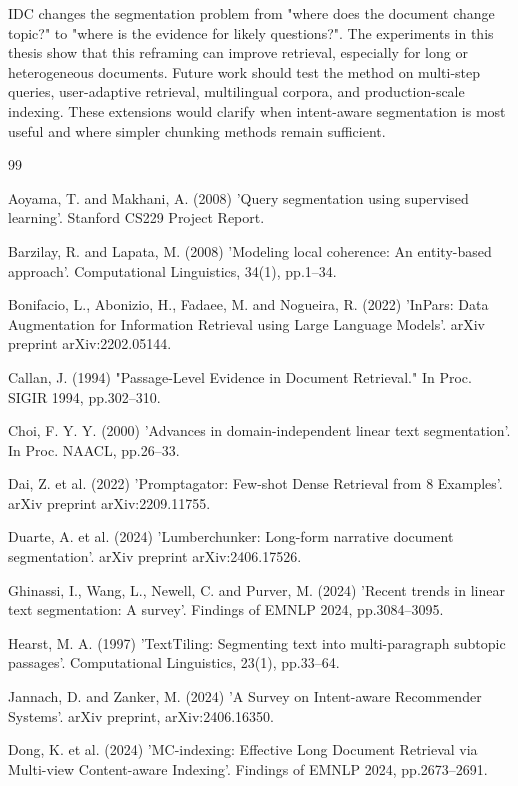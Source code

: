 \documentclass[12pt,a4paper]{report}
\begin{document}
IDC changes the segmentation problem from "where does the document change topic?" to "where is the evidence for likely questions?". The experiments in this thesis show that this reframing can improve retrieval, especially for long or heterogeneous documents. Future work should test the method on multi-step queries, user-adaptive retrieval, multilingual corpora, and production-scale indexing. These extensions would clarify when intent-aware segmentation is most useful and where simpler chunking methods remain sufficient.

\begin{thebibliography}{99}

 Aoyama, T. and Makhani, A. (2008) 'Query segmentation using supervised learning'. Stanford CS229 Project Report.

 Barzilay, R. and Lapata, M. (2008) 'Modeling local coherence: An entity-based approach'. Computational Linguistics, 34(1), pp.1--34.

 Bonifacio, L., Abonizio, H., Fadaee, M. and Nogueira, R. (2022) 'InPars: Data Augmentation for Information Retrieval using Large Language Models'. arXiv preprint arXiv:2202.05144.

 Callan, J. (1994) "Passage-Level Evidence in Document Retrieval." In Proc. SIGIR 1994, pp.302--310.

 Choi, F. Y. Y. (2000) 'Advances in domain-independent linear text segmentation'. In Proc. NAACL, pp.26--33.

 Dai, Z. et al. (2022) 'Promptagator: Few-shot Dense Retrieval from 8 Examples'. arXiv preprint arXiv:2209.11755.

 Duarte, A. et al. (2024) 'Lumberchunker: Long-form narrative document segmentation'. arXiv preprint arXiv:2406.17526.

 Ghinassi, I., Wang, L., Newell, C. and Purver, M. (2024) 'Recent trends in linear text segmentation: A survey'. Findings of EMNLP 2024, pp.3084--3095.

 Hearst, M. A. (1997) 'TextTiling: Segmenting text into multi-paragraph subtopic passages'. Computational Linguistics, 23(1), pp.33--64.

 Jannach, D. and Zanker, M. (2024) 'A Survey on Intent-aware Recommender Systems'. arXiv preprint, arXiv:2406.16350.

 Dong, K. et al. (2024) 'MC-indexing: Effective Long Document Retrieval via Multi-view Content-aware Indexing'. Findings of EMNLP 2024, pp.2673--2691.


\end{thebibliography}
\end{document}
